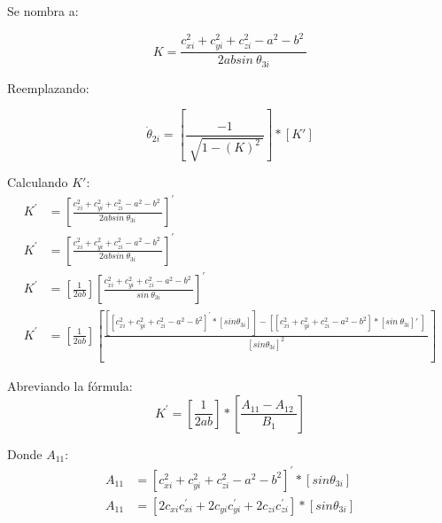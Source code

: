             Se nombra a:
            
            \begin{equation*}
                K= \frac{c_{xi}^{2}+c_{yi}^{2}+c_{zi}^{2}- a^{2}-b^{2}~}{2 ab sin~ \theta _{3i}}
            \end{equation*}
            
            Reemplazando:
            
            \begin{equation*}
                \dot{ \theta }_{2i}= \left[ \frac{-1}{\sqrt[]{1- \left( K \right) ^{2}~}} \right] \ast \left[ K' \right]
            \end{equation*}
            
            Calculando   $K'$:
            \begin{align*}
                 K^{'}&=  \left[ \frac{c_{xi}^{2}+c_{yi}^{2}+c_{zi}^{2}- a^{2}-b^{2}~}{2 ab sin~ \theta _{3i}} \right] ^{'} \\
                 K^{'}&=  \left[ \frac{c_{xi}^{2}+c_{yi}^{2}+c_{zi}^{2}- a^{2}-b^{2}~}{2 ab sin~ \theta _{3i}} \right] ^{'} \\
                 K^{'}&= \left[ \frac{1}{2ab} \right]  \left[ \frac{c_{xi}^{2}+c_{yi}^{2}+c_{zi}^{2}- a^{2}-b^{2}~}{sin~ \theta _{3i}} \right] ^{'} \\
                 K^{'}&= \left[ \frac{1}{2ab} \right]  \left[ \frac{ \left[  \left[ c_{xi}^{2}+c_{yi}^{2}+c_{zi}^{2}- a^{2}-b^{2} \right] ^{'}\ast \left[ sin  \theta _{3i} \right]  \right] - \left[  \left[ c_{xi}^{2}+c_{yi}^{2}+c_{zi}^{2}- a^{2}-b^{2} \right] \ast \left[ sin~ \theta _{3i} \right] '~ \right] ~}{ \left[ sin  \theta _{3i} \right] ^{2}} \right]  
            \end{align*}

            Abreviando la fórmula:
            \begin{equation*}
                 K^{'}= \left[ \frac{1}{2ab} \right] \ast \left[ \frac{A_{11}-A_{12}~}{B_{1}} \right]
            \end{equation*}

            Donde  $A_{11}$:
            \begin{align*}
                 A_{11}&= \left[ c_{xi}^{2}+c_{yi}^{2}+c_{zi}^{2}- a^{2}-b^{2} \right] ^{'}\ast \left[ sin  \theta _{3i} \right]  \\
                 A_{11}&= \left[ 2c_{xi}c_{xi}^{'}+2c_{yi}c_{yi}^{'}+2c_{zi}c_{zi}^{'} \right] \ast \left[ sin  \theta _{3i} \right]
            \end{align*}

